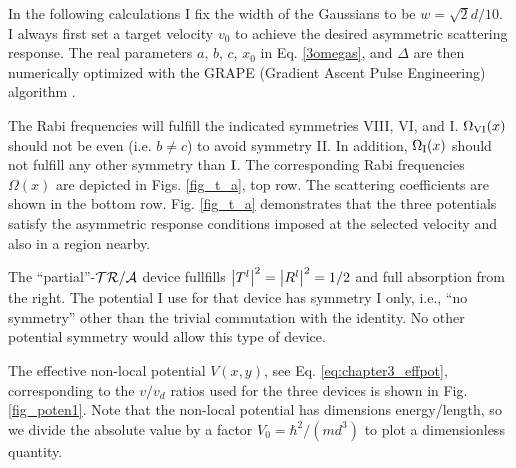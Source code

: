 In the following calculations I fix the width of the Gaussians to be $w= {\sqrt{2}}d/{10}$.
I always first set a target velocity $v_0$ to achieve the desired asymmetric scattering response.
The real parameters $a$, $b$, $c$, $x_0$ in Eq. \eqref{3omegas}, and  $\Delta$
are then numerically optimized with the GRAPE (Gradient Ascent Pulse Engineering) algorithm \cite{Khaneja2005,Wu2015}.

The Rabi frequencies will fulfill the indicated symmetries VIII, VI, and I. $\Omega_{\rm VI}(x)$ should not be even (i.e. $b \neq c$) to avoid symmetry II. In addition, $\Omega_{\rm I}(x)$ should not fulfill any other symmetry than ${\rm I}$.
The corresponding Rabi frequencies $\Omega(x)$ are  depicted in Figs. \ref{fig_t_a}, top row.
The scattering coefficients are shown in the bottom row. Fig. \ref{fig_t_a} demonstrates that the three potentials satisfy the asymmetric response conditions imposed
at the selected velocity and also in a region nearby.

The ``partial''-${\cal TR/A}$  device fullfills $\left| T^l \right|^2 = \left| R^l \right|^2 = 1/2$ and full absorption from the right.
The potential I use for that device has symmetry I only, i.e., ``no symmetry'' other than the trivial commutation with the identity. No other potential symmetry would allow this type of device.

The effective non-local potential $V(x,y)$, see Eq. \eqref{eq:chapter3_effpot}, corresponding to the $v/v_d$ ratios used for the three devices is shown in Fig. \ref{fig_poten1}. Note that the non-local potential has dimensions  energy/length, so  we
divide the absolute value by a factor $V_0=\hbar^2/(m d^3)$ to plot a dimensionless quantity.


